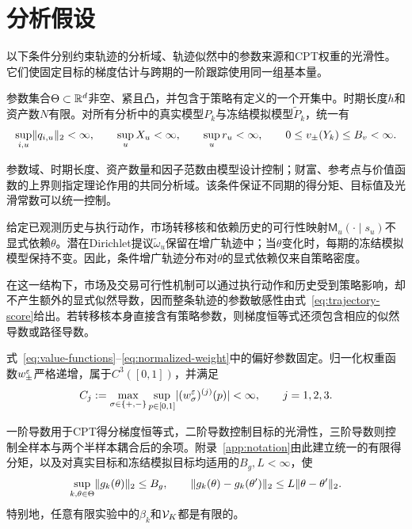 \section{分析假设}\label{sec:assumptions}

以下条件分别约束轨迹的分析域、轨迹似然中的参数来源和CPT权重的光滑性。它们使固定目标的梯度估计与跨期的一阶跟踪使用同一组基本量。

\begin{assumption}[策略参数与轨迹的共同有界域]\label{ass:trajectory}
参数集合$\Theta\subset\mathbb R^d$非空、紧且凸，并包含于策略有定义的一个开集中。时期长度$h$和资产数$N$有限。对所有分析中的真实模型$P_k$与冻结模拟模型$\widetilde P_k$，统一有
\begin{equation}\label{eq:primitive-bounds}
 \sup_{i,u}\lVert q_{i,u}\rVert_2<\infty,
 \qquad
 \sup_u X_u<\infty,
 \qquad
 \sup_u r_u<\infty,
 \qquad
 0\le v_\pm(Y_k)\le B_v<\infty.
\end{equation}
\end{assumption}

参数域、时期长度、资产数量和因子范数由模型设计控制；财富、参考点与价值函数的上界则指定理论作用的共同分析域。该条件保证不同期的得分矩、目标值及光滑常数可以统一控制。

\begin{assumption}[由策略传递的似然参数依赖]\label{ass:likelihood}
给定已观测历史与执行动作，市场转移核和依赖历史的可行性映射$\mathsf M_u(\cdot\mid s_u)$不显式依赖$\theta$。潜在Dirichlet提议$\widetilde\omega_u$保留在增广轨迹中；当$\theta$变化时，每期的冻结模拟模型保持不变。因此，条件增广轨迹分布对$\theta$的显式依赖仅来自策略密度。
\end{assumption}

在这一结构下，市场及交易可行性机制可以通过执行动作和历史受到策略影响，却不产生额外的显式似然导数，因而整条轨迹的参数敏感性由式~\eqref{eq:trajectory-score}给出。若转移核本身直接含有策略参数，则梯度恒等式还须包含相应的似然导数或路径导数。

\begin{assumption}[正则化CPT权重的光滑性]\label{ass:cpt-regularity}
式~\eqref{eq:value-functions}--\eqref{eq:normalized-weight}中的偏好参数固定。归一化权重函数$w_\pm^\varepsilon$严格递增，属于$C^3([0,1])$，并满足
\begin{equation}\label{eq:weight-derivative-bounds}
 C_j
 :=\max_{\sigma\in\{+,-\}}\sup_{p\in[0,1]}
 \lvert(w_\sigma^\varepsilon)^{(j)}(p)\rvert
 <\infty,
 \qquad j=1,2,3.
\end{equation}
\end{assumption}

一阶导数用于CPT得分梯度恒等式，二阶导数控制目标的光滑性，三阶导数则控制全样本与两个半样本耦合后的余项。附录~\ref{app:notation}由此建立统一的有限得分矩，以及对真实目标和冻结模拟目标均适用的$B_g,L<\infty$，使
\begin{equation}\label{eq:gradient-smoothness-summary}
 \sup_{k,\theta\in\Theta}\lVert g_k(\theta)\rVert_2\le B_g,
 \qquad
 \lVert g_k(\theta)-g_k(\theta')\rVert_2
 \le L\lVert\theta-\theta'\rVert_2.
\end{equation}
特别地，任意有限实验中的$\beta_k$和$\mathcal V_K$都是有限的。
